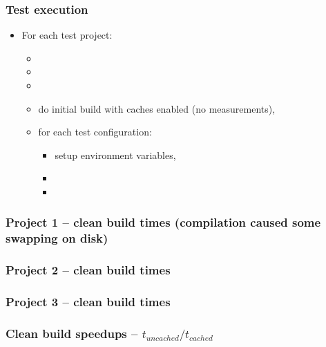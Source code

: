 \documentclass[compress,table,xcolor=table]{beamer}
\begin{document}
\begin{frame}
  \frametitle{Test execution}
    \Large
    \begin{itemize}
    \item For each test project:
    \begin{itemize}
    \item {}
    \item {}
    \item {}
    \item do initial build with caches enabled (no measurements),
    \item for each test configuration:
    \begin{itemize}
    \item setup environment variables,
    \item {}
    \item {}
    \end{itemize}
    \end{itemize}
    \end{itemize}
\end{frame}
\begin{frame}
  \frametitle{Project 1 -- clean build times {\smaller (compilation caused some swapping on disk)}}
\end{frame}
\begin{frame}
  \frametitle{Project 2 -- clean build times}
\end{frame}
\begin{frame}
  \frametitle{Project 3 -- clean build times}
\end{frame}
\begin{frame}
  \frametitle{Clean build speedups -- $t_{uncached} / t_{cached}$}
\end{frame}
\end{document}
